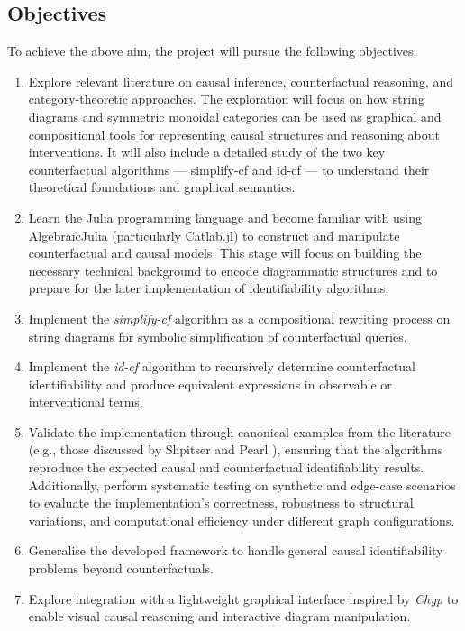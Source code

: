 \documentclass[12pt,a4paper]{article}
\begin{document}
\subsection*{Objectives}
To achieve the above aim, the project will pursue the following objectives:
\begin{enumerate}
    \item Explore relevant literature on causal inference, counterfactual reasoning, and category-theoretic approaches.
    The exploration will focus on how string diagrams and symmetric monoidal categories can be used as graphical and compositional tools for representing causal structures and reasoning about interventions. It will also include a detailed study of the two key counterfactual algorithms — simplify-cf and id-cf — to understand their theoretical foundations and graphical semantics.
    \item Learn the Julia programming language and become familiar with using AlgebraicJulia (particularly Catlab.jl) to construct and manipulate counterfactual and causal models. This stage will focus on building the necessary technical background to encode diagrammatic structures and to prepare for the later implementation of identifiability algorithms.
    \item Implement the \textit{simplify-cf} algorithm as a compositional rewriting process on string diagrams for symbolic simplification of counterfactual queries.
    \item Implement the \textit{id-cf} algorithm to recursively determine counterfactual identifiability and produce equivalent expressions in observable or interventional terms.
    \item Validate the implementation through canonical examples from the literature (e.g., those discussed by Shpitser and Pearl \cite{shpitser2008complete} ), ensuring that the algorithms reproduce the expected causal and counterfactual identifiability results. Additionally, perform systematic testing on synthetic and edge-case scenarios to evaluate the implementation’s correctness, robustness to structural variations, and computational efficiency under different graph configurations.
    \item Generalise the developed framework to handle general causal identifiability problems beyond counterfactuals.
    \item Explore integration with a lightweight graphical interface inspired by \textit{Chyp} to enable visual causal reasoning and interactive diagram manipulation.
\end{enumerate}
\end{document}
